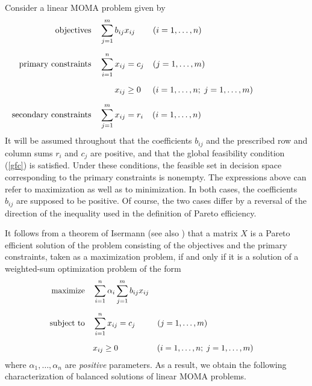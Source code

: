\documentclass{article}
\theoremstyle{definition}
\begin{document}
Consider a linear MOMA problem given by
\begin{subequations} \label{linmoma}
\begin{align}
\text{objectives} \quad & \sum_{j=1}^m b_{ij}x_{ij} & (i=1,\dots,n) \hspace{21.4mm}& \hspace{2cm} \\[2mm]
\text{primary constraints} \quad & \sum_{i=1}^n x_{ij} = c_j & (j=1,\dots,m) \hspace{20mm} \\[2mm]
& \hspace{6.2mm} x_{ij} \geq 0 & (i=1,\dots,n;\; j = 1,\dots,m) \\[2mm]
\text{secondary constraints} \quad & \sum_{j=1}^m x_{ij} = r_i & (i=1,\dots,n) \hspace{21.6mm}
\end{align}
\end{subequations}
It will be assumed throughout that the coefficients $b_{ij}$ and the prescribed row and column sums $r_i$ and $c_j$ are positive, and that the global feasibility condition (\ref{gfc}) is satisfied. Under these conditions, the feasible set in decision space corresponding to the primary constraints is nonempty. The expressions above can refer to maximization as well as to minimization. In both cases, the coefficients $b_{ij}$ are supposed to be positive. Of course, the two cases differ by a reversal of the direction of the inequality used in the definition of Pareto efficiency.

It follows from a theorem of Isermann \cite{Isermann74} (see also \cite[Thm.\,6.6]{Ehrgott}) that a matrix $X$ is a Pareto efficient solution of the problem consisting of the objectives and the primary constraints, taken as a maximization problem, if and only if it is a solution of a weighted-sum optimization problem of the form
\begin{subequations} \label{ws}
\begin{align}
\hspace{2cm} \text{maximize} \quad & \sum_{i=1}^n \alpha_i \sum_{j=1}^m b_{ij}x_{ij}\\[2mm]
\text{subject to} \quad & \sum_{i=1}^n x_{ij} = c_j & (j=1,\dots,m) \hspace{20mm} \\[2mm]
& x_{ij} \geq 0 & (i=1,\dots,n;\; j = 1,\dots,m) & \hspace{2cm}
\end{align}
\end{subequations}
where $\alpha_1,\dots,\alpha_n$ are \emph{positive} parameters. As a result, we obtain the following characterization of balanced solutions of linear MOMA problems.
\end{document}
